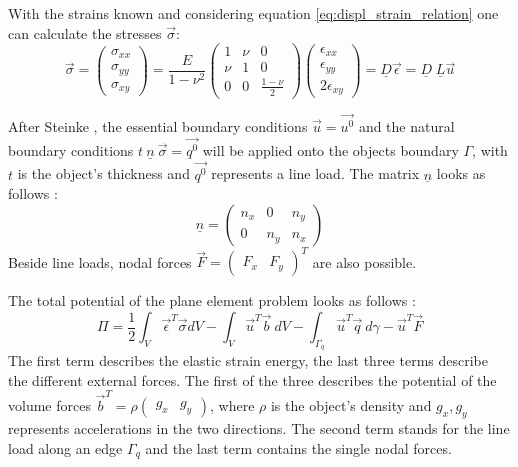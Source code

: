   With the strains known and considering equation \ref{eq:displ_strain_relation} one can calculate the stresses $\vec{\sigma}$:
  \begin{equation}\label{eq:sigma=D*eps}
  \vec{\sigma} = \begin{pmatrix}
  \sigma_{xx} \\
  \sigma_{yy} \\
  \sigma_{xy}
  \end{pmatrix} = \frac{E}{1-\nu^2} \begin{pmatrix}
  1 & \nu & 0 \\
  \nu & 1 & 0 \\
  0 & 0 & \frac{1-\nu}{2}
  \end{pmatrix} \begin{pmatrix}
  \epsilon_{xx} \\
  \epsilon_{yy} \\
  2\epsilon_{xy}
  \end{pmatrix} = \underline{D} \vec{\epsilon} = \underline{D}\; \underline{L} \vec{u}
  \end{equation}

  After Steinke \cite{steinke2005finite}, the essential boundary conditions $\vec{u} = \vec{u^0}$ and the natural boundary conditions $t\ \underline{n}\ \vec{\sigma} = \vec{q^0}$ will be applied onto the objects boundary $\Gamma$, with $t$ is the object's thickness and $\vec{q^0}$ represents a line load. The matrix $\underline{n}$ looks as follows \cite{steinke2005finite}:
  \begin{equation}
  \underline{n} = \begin{pmatrix}
  n_x & 0 & n_y\\ 0 & n_y & n_x
  \end{pmatrix}
  \end{equation}
  Beside line loads, nodal forces $\vec{F} = \begin{pmatrix}
  F_x & F_y
  \end{pmatrix}^T$ are also possible.
  
  The total potential of the plane element problem looks as follows \cite{steinke2005finite}:
  \begin{equation}
  \Pi = \frac{1}{2} \int_{V}\vec{\epsilon}^T\vec{\sigma}dV - \int_{V} \vec{u}^T \vec{b}\ dV - \int_{\Gamma_q}\vec{u}^T \vec{q}\ d\gamma -\vec{u}^T \vec{F}
  \end{equation}
  The first term describes the elastic strain energy, the last three terms describe the different external forces. The first of the three describes the potential of the volume forces $\vec{b}^T = \rho \begin{pmatrix}
  g_x & g_y
  \end{pmatrix}$, where $\rho$ is the object's density and $g_x, g_y$ represents accelerations in the two directions. The second term stands for the line load along an edge $\Gamma_q$ and the last term contains the single nodal forces.
  
